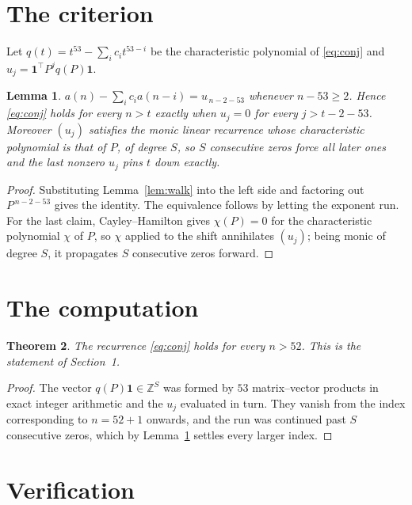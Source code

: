 \documentclass[11pt,a4paper]{article}
\theoremstyle{plain}
\newtheorem{theorem}{Theorem}
\newtheorem{lemma}[theorem]{Lemma}
\theoremstyle{definition}
\begin{document}
\section{The criterion}

Let $q(t)=t^{53}-\sum_i c_i t^{53-i}$ be the characteristic polynomial of
\eqref{eq:conj} and $u_j=\mathbf{1}^{\!\top}P^{j}q(P)\mathbf{1}$.

\begin{lemma}\label{lem:crit}
$a(n)-\sum_i c_i a(n-i)=u_{\,n-2-53}$ whenever $n-53\ge2$. Hence
\eqref{eq:conj} holds for every $n>t$ exactly when $u_j=0$ for every
$j>t-2-53$. Moreover $(u_j)$ satisfies the monic linear recurrence whose
characteristic polynomial is that of $P$, of degree $S$, so $S$ consecutive zeros force all
later ones and the last nonzero $u_j$ pins $t$ down exactly.
\end{lemma}

\begin{proof}
Substituting Lemma~\ref{lem:walk} into the left side and factoring out
$P^{\,n-2-53}$ gives the identity. The equivalence follows by letting the exponent
run. For the last claim, Cayley--Hamilton gives $\chi(P)=0$ for the characteristic
polynomial $\chi$ of $P$, so $\chi$ applied to the shift annihilates $(u_j)$; being monic of
degree $S$, it propagates $S$ consecutive zeros forward.
\end{proof}

\section{The computation}

\begin{theorem}
The recurrence \eqref{eq:conj} holds for every $n>52$. This is the statement of
Section~1.
\end{theorem}

\begin{proof}
The vector $q(P)\mathbf{1}\in\mathbb{Z}^{S}$ was formed by $53$ matrix--vector
products in exact integer arithmetic and the $u_j$ evaluated in turn. They vanish from the
index corresponding to $n=52+1$ onwards, and the run was continued past $S$ consecutive
zeros, which by Lemma~\ref{lem:crit} settles every larger index.
\end{proof}

\section{Verification}
\end{document}
